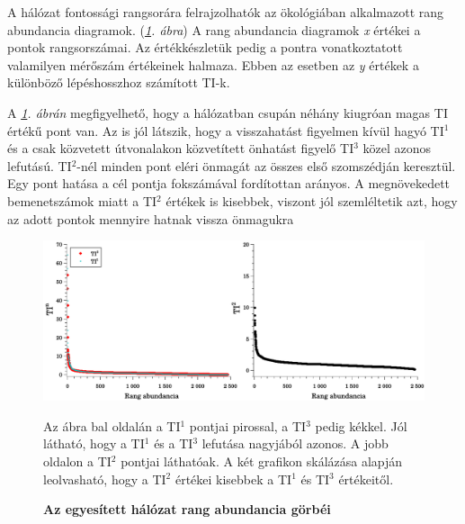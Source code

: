 \documentclass[a4paper,12pt]{article}
\newenvironment{imgdesc}{
		\small
		\singlespacing
		\begin{center}
		
	}{
		\end{center}	
	}
\begin{document}
			A hálózat fontossági rangsorára felrajzolhatók az ökológiában alkalmazott rang abundancia diagramok.  (\textit{\ref{fig:mergedTIs}. ábra}) A rang abundancia diagramok \textit{x} értékei a pontok rangsorszámai. Az értékkészletük pedig a pontra vonatkoztatott valamilyen mérőszám értékeinek halmaza. Ebben az esetben az \textit{y} értékek a különböző lépéshosszhoz számított TI-k.
			
			A \textit{\ref{fig:mergedTIs}. ábrán} megfigyelhető, hogy a hálózatban csupán néhány kiugróan magas TI értékű pont van. Az is jól látszik, hogy a visszahatást figyelmen kívül hagyó TI$^1$ és a csak közvetett útvonalakon közvetített önhatást figyelő TI$^3$ közel azonos lefutású. TI$^2$-nél minden pont eléri önmagát az összes első szomszédján keresztül. Egy pont hatása a cél pontja fokszámával fordítottan arányos. A megnövekedett bemenetszámok miatt a TI$^2$ értékek is kisebbek, viszont jól szemléltetik azt, hogy az adott pontok mennyire hatnak vissza önmagukra			
			
			\begin{figure}[H]
				\includegraphics[scale=0.5]{img/mergedTIs.pdf}
				\centering
				\caption{\textbf{ Az egyesített hálózat rang abundancia görbéi}}
				\begin{imgdesc}
					Az ábra bal oldalán a TI$^1$ pontjai pirossal, a TI$^3$ pedig kékkel. Jól látható, hogy a TI$^1$ és a TI$^3$ lefutása nagyjából azonos. A jobb oldalon a TI$^2$ pontjai láthatóak. A két grafikon skálázása alapján leolvasható, hogy a TI$^2$ értékei kisebbek a TI$^1$ és TI$^3$ értékeitől.
				\end{imgdesc}
	
				\label{fig:mergedTIs}			 		 
			\end{figure}
\end{document}

